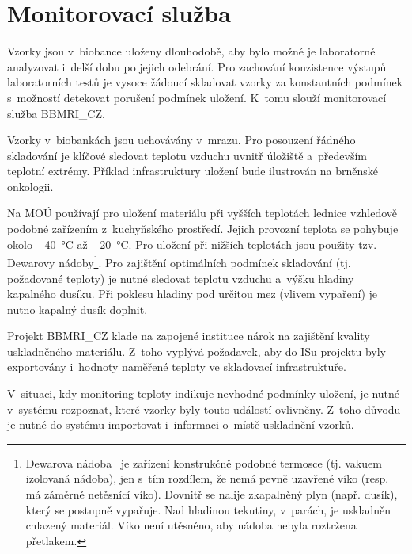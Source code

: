 \documentclass[11pt, draft, oneside]{fithesis2}
\newcommand{\ProjectName}{\mbox{BBMRI\_CZ}\xspace}
\begin{document}
\section{Monitorovací služba}\label{chapter:analysis:section:monitoring}
Vzorky jsou v~biobance uloženy dlouhodobě, aby bylo možné je laboratorně analyzovat i~delší dobu po jejich odebrání. Pro zachování konzistence výstupů laboratorních testů je vysoce žádoucí skladovat vzorky za konstantních podmínek s~možností detekovat porušení podmínek uložení. K~tomu slouží monitorovací služba \ProjectName.

Vzorky v~biobankách jsou uchovávány v~mrazu. Pro posouzení řádného skladování je klíčové sledovat teplotu vzduchu uvnitř úložiště a~především teplotní extrémy. Příklad infrastruktury uložení bude ilustrován na brněnské onkologii. 

Na MOÚ používají pro uložení materiálu při vyšších teplotách lednice vzhledově podobné zařízením z~kuchyňského prostředí. Jejich provozní teplota se pohybuje okolo \SI{-40}{\celsius} až \SI{-20}{\celsius}. Pro uložení při nižších teplotách jsou použity tzv. Dewarovy nádoby\footnote{Dewarova nádoba~\cite{dewar} je zařízení konstrukčně podobné termosce (tj. vakuem izolovaná nádoba), jen s~tím rozdílem, že nemá pevně uzavřené víko (resp. má záměrně netěsnící víko). Dovnitř se nalije zkapalněný plyn (např. dusík), který se postupně vypařuje. Nad hladinou tekutiny, v~parách, je uskladněn chlazený materiál. Víko není utěsněno, aby nádoba nebyla roztržena přetlakem.}. Pro zajištění optimálních podmínek skladování (tj. požadované teploty) je nutné sledovat teplotu vzduchu a~výšku hladiny kapalného dusíku. Při poklesu hladiny pod určitou mez (vlivem vypaření) je nutno kapalný dusík doplnit. 

Projekt \ProjectName klade na zapojené instituce nárok na zajištění kvality uskladněného materiálu. Z~toho vyplývá požadavek, aby do ISu projektu byly exportovány i~hodnoty naměřené teploty ve skladovací infrastruktuře.

V~situaci, kdy monitoring teploty indikuje nevhodné podmínky uložení, je nutné v~systému rozpoznat, které vzorky byly touto událostí ovlivněny. Z~toho důvodu je nutné do systému importovat i~informaci o~místě uskladnění vzorků.

\end{document}
